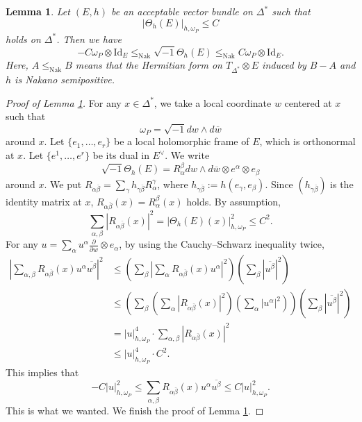\documentclass[12pt,twoside]{amsart}
\newtheorem{lem}[thm]{Lemma}
\theoremstyle{definition}
\begin{document}
\begin{lem}\label{p-lem2.5}
Let $(E, h)$ be an acceptable vector bundle on $\Delta^*$ such that 
\[
|\Theta_h(E)|_{h, \omega_P} \leq C
\]
holds on $\Delta^*$. Then we have
\[
-C \omega_P \otimes \mathrm{Id}_E  \leq_{\mathrm{Nak}}  
\sqrt{-1} \Theta_h(E) \leq_{\mathrm{Nak}} 
C \omega_P \otimes \mathrm{Id}_E.
\]
Here, $A \leq_{\mathrm{Nak}} B$ means that the Hermitian 
form on $T_{\Delta^*} \otimes E$ induced by $B - A$ and $h$ is Nakano semipositive.
\end{lem}

\begin{proof}[Proof of Lemma \ref{p-lem2.5}]
For any $x\in \Delta^*$, we take 
a local coordinate $w$ centered at $x$ such that 
\[
\omega_P=\sqrt{-1} dw \wedge d\overline {w} 
\] 
around $x$. Let $\{e_1, \ldots, e_r\}$ be a local 
holomorphic frame of $E$, which is orthonormal at $x$. 
Let $\{e^1, \ldots, e^r\}$ be its 
dual in $E^\vee$. We write 
\[
\sqrt{-1} \Theta_h(E)=R^\beta_\alpha dw\wedge d\overline{w} \otimes 
e^\alpha \otimes e_\beta
\] 
around $x$. 
We put $R_{\alpha \overline \beta}=\sum _\gamma h_{\gamma 
\overline \beta} R^\gamma _\alpha$, where 
$h_{\gamma \overline\beta}:=h(e_\gamma, e_\beta)$. 
Since $(h_{\gamma \overline \beta})$ is the identity matrix at $x$, 
$R_{\alpha \overline \beta}(x)=R^\beta_\alpha (x)$ holds. 
By assumption, 
\[
\sum_{\alpha, \beta} |R_{\alpha \overline \beta}(x)|^2 
=|\Theta_h(E)(x)|^2_{h, \omega_P} \leq C^2. 
\] 
For any $u=\sum _{\alpha} u^\alpha \frac{\partial}{\partial w} 
\otimes e_\alpha$, by using the Cauchy--Schwarz inequality twice, 
\[
\begin{split}
\left|\sum _{\alpha, \beta} R_{\alpha \overline \beta}(x) u^\alpha \overline
{u^\beta}\right|^2&\leq 
\left( \sum _\beta \left|\sum _\alpha  R_{\alpha 
\overline \beta} (x) u^\alpha\right|^2\right) 
\left(\sum _\beta |\overline {u^\beta}|^2\right)\\ 
&\leq \left(\sum _\beta \left(\sum _\alpha |R_{\alpha 
\overline\beta}(x)|^2\right)\left(\sum _\alpha |u^\alpha|^2\right)\right)
\left(\sum _\beta |\overline{u^\beta}|^2\right)
\\ 
&= |u|^4_{h, \omega_P}\cdot \sum _{\alpha, \beta} |R_{\alpha \overline \beta} (x)|^2
\\ 
&\leq |u|^4_{h, \omega_P} \cdot C^2.  
\end{split}
\] 
This implies that 
\[
-C |u|^2_{h, \omega_P} \leq \sum _{\alpha, \beta} 
R_{\alpha\overline \beta} (x) u^\alpha \overline {u^\beta}
\leq C|u|^2_{h, \omega_P}. 
\] 
This is what we wanted. We finish the proof of Lemma \ref{p-lem2.5}. 
\end{proof}
\end{document}
